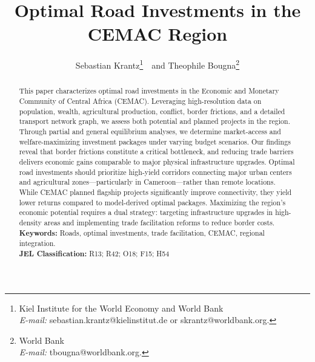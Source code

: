 \documentclass[a4paper]{article}
\title{\textbf{Optimal Road Investments in the CEMAC Region}}
\author{Sebastian Krantz\footnote{Kiel Institute for the World Economy and World Bank\\ \hphantom{aaa}\textit{E-mail:} sebastian.krantz@kielinstitut.de or skrantz@worldbank.org.}\ \ and Theophile Bougna\footnote{World Bank\\ \hphantom{aaa}\textit{E-mail:} tbougna@worldbank.org.}}
\begin{document}
\maketitle


\begin{abstract}

This paper characterizes optimal road investments in the Economic and Monetary Community of Central Africa (CEMAC). Leveraging high-resolution data on population, wealth, agricultural production, conflict, border frictions, and a detailed transport network graph, we assess both potential and planned projects in the region. Through partial and general equilibrium analyses, we determine market-access and welfare-maximizing investment packages under varying budget scenarios. Our findings reveal that border frictions constitute a critical bottleneck, and reducing trade barriers delivers economic gains comparable to major physical infrastructure upgrades. Optimal road investments should prioritize high-yield corridors connecting major urban centers and agricultural zones—particularly in Cameroon—rather than remote locations. While CEMAC planned flagship projects significantly improve connectivity, they yield lower returns compared to model-derived optimal packages. Maximizing the region's economic potential requires a dual strategy: targeting infrastructure upgrades in high-density areas and implementing trade facilitation reforms to reduce border costs.
\\ [0.7em]
\noindent \textbf{Keywords:} Roads, optimal investments, trade facilitation, CEMAC, regional integration.\\
\textbf{JEL Classification:} R13; R42; O18; F15; H54
\end{abstract}
\end{document}
